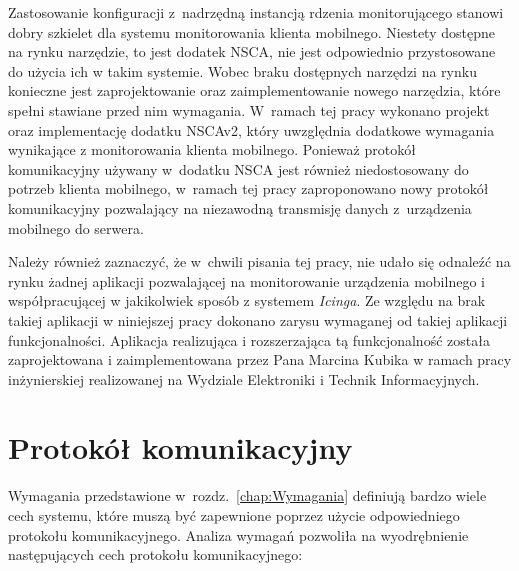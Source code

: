 Zastosowanie konfiguracji z~nadrzędną instancją rdzenia monitorującego
stanowi dobry szkielet dla systemu monitorowania klienta
mobilnego. Niestety dostępne na rynku narzędzie, to jest dodatek NSCA,
nie jest odpowiednio przystosowane do użycia ich w takim
systemie. Wobec braku dostępnych narzędzi na rynku konieczne jest
zaprojektowanie oraz zaimplementowanie nowego narzędzia, które spełni
stawiane przed nim wymagania. W~ramach tej pracy wykonano projekt oraz
implementację dodatku NSCAv2, który uwzględnia dodatkowe wymagania
wynikające z monitorowania klienta mobilnego. Ponieważ protokół
komunikacyjny używany w~dodatku NSCA jest również niedostosowany do
potrzeb klienta mobilnego, w~ramach tej pracy zaproponowano nowy
protokół komunikacyjny pozwalający na niezawodną transmisję danych
z~urządzenia mobilnego do serwera.

Należy również zaznaczyć, że w~chwili pisania tej pracy, nie udało się
odnaleźć na rynku żadnej aplikacji pozwalającej na monitorowanie
urządzenia mobilnego i współpracującej w jakikolwiek sposób z systemem
{\em Icinga}. Ze względu na brak takiej aplikacji w niniejszej pracy
dokonano zarysu wymaganej od takiej aplikacji
funkcjonalności. Aplikacja realizująca i rozszerzająca tą
funkcjonalność została zaprojektowana i zaimplementowana przez Pana
Marcina Kubika w ramach pracy inżynierskiej\cite{book:pracaKubika}
realizowanej na Wydziale Elektroniki i Technik Informacyjnych.


\section[Protokół komunikacyjny][Protokół komunikacyjny]{Protokół komunikacyjny}
\label{sec:ProtKom}

Wymagania przedstawione w~rozdz.~\ref{chap:Wymagania} definiują bardzo wiele
cech systemu, które muszą być zapewnione poprzez użycie odpowiedniego
protokołu komunikacyjnego. Analiza wymagań pozwoliła na wyodrębnienie
następujących cech protokołu komunikacyjnego:

